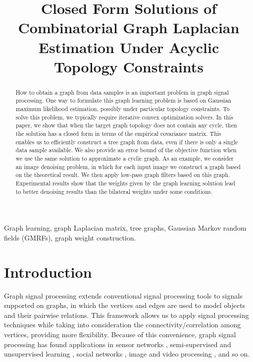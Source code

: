 \documentclass{article}
\title{Closed Form Solutions of Combinatorial Graph Laplacian Estimation Under Acyclic Topology Constraints}
\begin{document}
\ninept
%
\maketitle
%
\begin{abstract}
How to obtain a graph from data samples is an important problem in graph signal processing. One way to formulate this graph learning problem is based on Gaussian maximum likelihood estimation, possibly under particular topology constraints. To solve this problem, we typically require iterative convex optimization solvers. In this paper, we show that when the target graph topology does not contain any cycle, then the solution has a closed form in terms of the empirical covariance matrix. This enables us to efficiently construct a tree graph from data, even if there is only a single data sample available. We also provide an error bound of the objective function when we use the same solution to approximate a cyclic graph. 
As an example, we consider an image denoising problem, in which for each input image we construct a graph based on the theoretical result. We then apply low-pass graph filters based on this graph. Experimental results show that the weights given by the graph learning solution lead to better denoising results than the bilateral weights under some conditions. 
% 
% 

\end{abstract}
%
\begin{keywords}
Graph learning, graph Laplacian matrix, tree graphs, Gaussian Markov random fields (GMRFs), graph weight construction.
\end{keywords}
%
\section{Introduction}
\label{sec:intro}
Graph signal processing \cite{Shuman2013,Sandryhaila2013} extends conventional signal processing tools to signals supported on graphs, in which the vertices and edges are used to model objects and their pairwise relations. This framework allows us to apply signal processing techniques while taking into consideration the connectivity/correlation among vertices, providing more flexibility. Because of this convenience, graph signal processing has found applications in sensor networks \cite{Jablonski2017}, semi-supervised and unsupervised learning \cite{Gadde2014}, social networks \cite{Hassan2016}, image and video processing \cite{Shen2010}, and so on.
\end{document}

